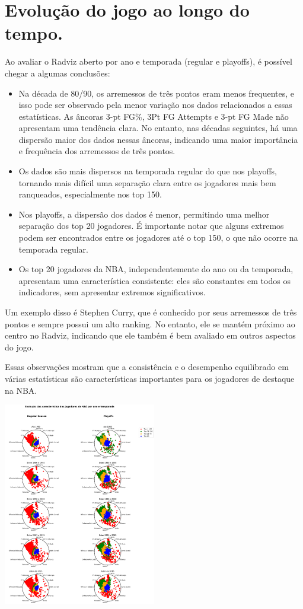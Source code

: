 \documentclass[
]{book}
\begin{document}
\hypertarget{evoluuxe7uxe3o-do-jogo-ao-longo-do-tempo.}{%
\chapter{Evolução do jogo ao longo do tempo.}\label{evoluuxe7uxe3o-do-jogo-ao-longo-do-tempo.}}

Ao avaliar o Radviz aberto por ano e temporada (regular e playoffs), é possível chegar a algumas conclusões:

\begin{itemize}
\item
  Na década de 80/90, os arremessos de três pontos eram menos frequentes, e isso pode ser observado pela menor variação nos dados relacionados a essas estatísticas. As âncoras 3-pt FG\%, 3Pt FG Attempts e 3-pt FG Made não apresentam uma tendência clara. No entanto, nas décadas seguintes, há uma dispersão maior dos dados nessas âncoras, indicando uma maior importância e frequência dos arremessos de três pontos.
\item
  Os dados são mais dispersos na temporada regular do que nos playoffs, tornando mais difícil uma separação clara entre os jogadores mais bem ranqueados, especialmente nos top 150.
\item
  Nos playoffs, a dispersão dos dados é menor, permitindo uma melhor separação dos top 20 jogadores. É importante notar que alguns extremos podem ser encontrados entre os jogadores até o top 150, o que não ocorre na temporada regular.
\item
  Os top 20 jogadores da NBA, independentemente do ano ou da temporada, apresentam uma característica consistente: eles são constantes em todos os indicadores, sem apresentar extremos significativos.
\end{itemize}

Um exemplo disso é Stephen Curry, que é conhecido por seus arremessos de três pontos e sempre possui um alto ranking. No entanto, ele se mantém próximo ao centro no Radviz, indicando que ele também é bem avaliado em outros aspectos do jogo.

Essas observações mostram que a consistência e o desempenho equilibrado em várias estatísticas são características importantes para os jogadores de destaque na NBA.

\includegraphics[width=0.5\textwidth,height=\textheight]{imagens/14.png}
\end{document}
